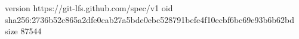 version https://git-lfs.github.com/spec/v1
oid sha256:2736b52c865a2dfe0cab27a5bde0ebc528791befe4f10ecbf6bc69e93b6b62bd
size 87544
